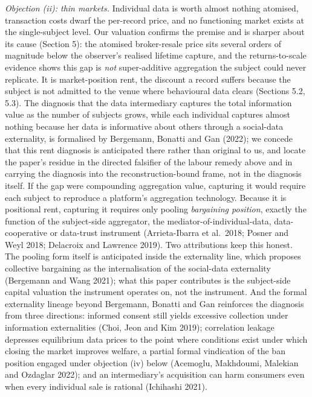 \documentclass[
  11pt,
]{article}
\begin{document}
\emph{Objection (ii): thin markets.} Individual data is worth almost
nothing atomised, transaction costs dwarf the per-record price, and no
functioning market exists at the single-subject level. Our valuation
confirms the premise and is sharper about its cause (Section 5): the
atomised broker-resale price sits several orders of magnitude below the
observer's realised lifetime capture, and the returns-to-scale evidence
shows this gap is \emph{not} super-additive aggregation the subject
could never replicate. It is market-position rent, the discount a record
suffers because the subject is not admitted to the venue where
behavioural data clears (Sections 5.2, 5.3). The diagnosis that the data
intermediary captures the total information value as the number of
subjects grows, while each individual captures almost nothing because
her data is informative about others through a social-data externality,
is formalised by Bergemann, Bonatti and Gan (2022); we concede that this
rent diagnosis is anticipated there rather than original to us, and
locate the paper's residue in the directed falsifier of the labour
remedy above and in carrying the diagnosis into the reconstruction-bound
frame, not in the diagnosis itself. If the gap were compounding
aggregation value, capturing it would require each subject to reproduce
a platform's aggregation technology. Because it is positional rent,
capturing it requires only pooling \emph{bargaining position}, exactly
the function of the subject-side aggregator, the
mediator-of-individual-data, data-cooperative or data-trust instrument
(Arrieta-Ibarra et al.~2018; Posner and Weyl 2018; Delacroix and
Lawrence 2019). Two attributions keep this honest. The pooling form
itself is anticipated inside the externality line, which proposes
collective bargaining as the internalisation of the social-data
externality (Bergemann and Wang 2021); what this paper contributes is
the subject-side capital valuation the instrument operates on, not the
instrument. And the formal externality lineage beyond Bergemann, Bonatti
and Gan reinforces the diagnosis from three directions: informed consent
still yields excessive collection under information externalities (Choi,
Jeon and Kim 2019); correlation leakage depresses equilibrium data
prices to the point where conditions exist under which closing the
market improves welfare, a partial formal vindication of the ban
position engaged under objection (iv) below (Acemoglu, Makhdoumi,
Malekian and Ozdaglar 2022); and an intermediary's acquisition can harm
consumers even when every individual sale is rational (Ichihashi 2021).
\end{document}
